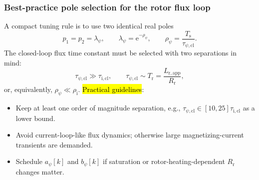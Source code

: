 \begin{frame}
    \frametitle{Best-practice pole selection for the rotor flux loop}
    A compact tuning rule is to use two identical real poles
    \begin{equation}
        p_1=p_2=\lambda_\psi,
        \qquad
        \lambda_\psi=\mathrm{e}^{-\rho_\psi},
        \qquad
        \rho_\psi=\frac{T_\mathrm{s}}{\tau_{\psi,\mathrm{cl}}} .
        \label{eq:IM_flux_pole_selection}
    \end{equation}\pause%
    The closed-loop flux time constant must be selected with two separations in mind:
    \begin{equation}
        \tau_{\psi,\mathrm{cl}}\gg\tau_{\mathrm{i},\mathrm{cl}},
        \qquad
        \tau_{\psi,\mathrm{cl}}\sim T_\mathrm{r}=\frac{L_{\mathrm{r},\mathrm{app}}}{R_\mathrm{r}},
        \label{eq:IM_flux_time_scale_separation}
    \end{equation}
    or, equivalently, $\rho_\psi\ll\rho_\mathrm{i}$. \pause%
    \hl{Practical guidelines}:
    \begin{itemize}
        \item Keep at least one order of magnitude separation, e.g., $\tau_{\psi,\mathrm{cl}}\in[10,25]\tau_{\mathrm{i},\mathrm{cl}}$ as a lower bound.
        \item Avoid current-loop-like flux dynamics; otherwise large magnetizing-current transients are demanded.
        \item Schedule $a_\psi[k]$ and $b_\psi[k]$ if saturation or rotor-heating-dependent $R_\mathrm{r}$ changes matter.
    \end{itemize}
\end{frame}

